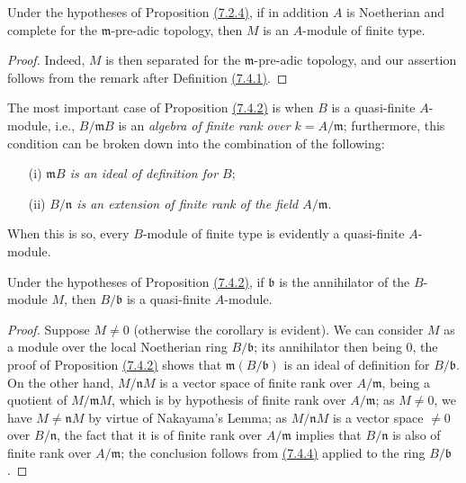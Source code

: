 \begin{cor}[7.4.3]
\label{cor-0.7.4.3}
Under the hypotheses of Proposition \hyperref[prop-0.7.2.4]{(7.2.4)}, if in addition $A$ is
Noetherian and complete for the $\mathfrak{m}$-pre-adic topology, then $M$ is an $A$-module
of finite type.
\end{cor}

\begin{proof}
\label{proof-cor-0.7.4.3}
Indeed, $M$ is then separated for the $\mathfrak{m}$-pre-adic topology, and our assertion
follows from the remark after Definition \hyperref[defn-0.7.4.1]{(7.4.1)}.
\end{proof}

\begin{env}[7.4.4]
\label{env-0.7.4.4}
The most important case of Proposition \hyperref[prop-0.7.4.2]{(7.4.2)} is when $B$ is a
quasi-finite $A$-module, i.e., $B/\mathfrak{m}B$ is an {\em algebra of finite rank over
$k=A/\mathfrak{m}$}; furthermore, this condition can be broken down into the combination
of the following:
\begin{itemize}
  \item[(i)] {\em $\mathfrak{m}B$ is an ideal of definition for $B$};
  \item[(ii)] {\em $B/\mathfrak{n}$ is an extension of finite rank of the field $A/\mathfrak{m}$}.
\end{itemize}
When this is so, every $B$-module of finite type is evidently a quasi-finite $A$-module.
\end{env}

\begin{cor}[7.4.5]
\label{cor-0.7.4.5}
Under the hypotheses of Proposition \hyperref[prop-0.7.4.2]{(7.4.2)}, if
$\mathfrak{b}$ is the annihilator of the $B$-module $M$, then $B/\mathfrak{b}$ is a
quasi-finite $A$-module.
\end{cor}

\begin{proof}
\label{proof-cor-0.7.4.5}
Suppose $M\neq 0$ (otherwise the corollary is evident). We can consider $M$ as a
module over the local Noetherian ring $B/\mathfrak{b}$; its annihilator then being
$0$, the proof of Proposition \hyperref[prop-0.7.4.2]{(7.4.2)} shows that
$\mathfrak{m}(B/\mathfrak{b})$ is an ideal of definition for $B/\mathfrak{b}$.
On the other hand, $M/\mathfrak{n}M$ is a vector space of finite rank over
$A/\mathfrak{m}$, being a quotient of $M/\mathfrak{m}M$, which is by hypothesis of
finite rank over $A/\mathfrak{m}$; as $M\neq 0$, we have $M\neq\mathfrak{n}M$ by
virtue of Nakayama's Lemma; as $M/\mathfrak{n}M$ is a vector space $\neq 0$ over
$B/\mathfrak{n}$, the fact that it is of finite rank over $A/\mathfrak{m}$ implies
that $B/\mathfrak{n}$ is also of finite rank over $A/\mathfrak{m}$; the conclusion
follows from \hyperref[env-0.7.4.4]{(7.4.4)} applied to the ring $B/\mathfrak{b}$.
\end{proof}

